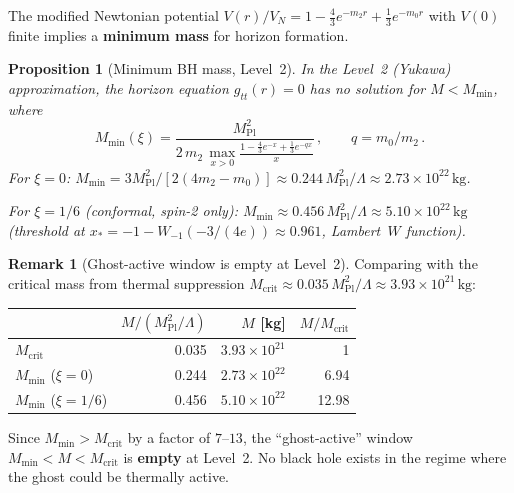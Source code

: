 \documentclass[11pt,a4paper]{article}
\newcommand{\Mcrit}{M_{\mathrm{crit}}}
\theoremstyle{plain}
\newtheorem{proposition}[theorem]{Proposition}
\theoremstyle{definition}
\newtheorem{remark}[theorem]{Remark}
\begin{document}
The modified Newtonian potential
$V(r)/V_N = 1 - \frac{4}{3}e^{-m_2 r} + \frac{1}{3}e^{-m_0 r}$
with $V(0)$ finite implies a \textbf{minimum mass} for horizon formation.

\begin{proposition}[Minimum BH mass, Level~2]\label{prop:mmin}
In the Level~2 (Yukawa) approximation, the horizon equation
$g_{tt}(r) = 0$ has no solution for $M < M_{\min}$, where
\begin{equation}\label{eq:mmin}
  M_{\min}(\xi)
  = \frac{M_{\mathrm{Pl}}^2}
  {2\,m_2\,\displaystyle\max_{x>0}
    \frac{1 - \frac{4}{3}e^{-x} + \frac{1}{3}e^{-q x}}{x}}\,,
  \qquad q = m_0/m_2\,.
\end{equation}
For $\xi = 0$\textup{:}
$M_{\min} = 3 M_{\mathrm{Pl}}^2 / [2(4m_2 - m_0)]
\approx 0.244\,M_{\mathrm{Pl}}^2/\Lambda
\approx 2.73 \times 10^{22}\,\mathrm{kg}$.

For $\xi = 1/6$ (conformal, spin-2 only)\textup{:}
$M_{\min} \approx 0.456\,M_{\mathrm{Pl}}^2/\Lambda
\approx 5.10 \times 10^{22}\,\mathrm{kg}$
\textup{(}threshold at $x_* = -1 - W_{-1}(-3/(4e)) \approx 0.961$,
Lambert~$W$ function\textup{)}.
\end{proposition}

\begin{remark}[Ghost-active window is empty at Level~2]
  Comparing with the critical mass from thermal suppression
  $\Mcrit \approx 0.035\,M_{\mathrm{Pl}}^2/\Lambda
  \approx 3.93 \times 10^{21}\,\mathrm{kg}$:

  \begin{center}
  \begin{tabular}{lrrr}
  \toprule
  & $M/(M_{\mathrm{Pl}}^2/\Lambda)$ & $M$ [kg] & $M/\Mcrit$ \\
  \midrule
  $\Mcrit$ & 0.035 & $3.93 \times 10^{21}$ & 1 \\
  $M_{\min}$ ($\xi = 0$) & 0.244 & $2.73 \times 10^{22}$ & 6.94 \\
  $M_{\min}$ ($\xi = 1/6$) & 0.456 & $5.10 \times 10^{22}$ & 12.98 \\
  \bottomrule
  \end{tabular}
  \end{center}

  Since $M_{\min} > \Mcrit$ by a factor of $7$--$13$, the
  ``ghost-active'' window $M_{\min} < M < \Mcrit$ is \textbf{empty}
  at Level~2.  No black hole exists in the regime where the ghost
  could be thermally active.
\end{remark}
\end{document}
